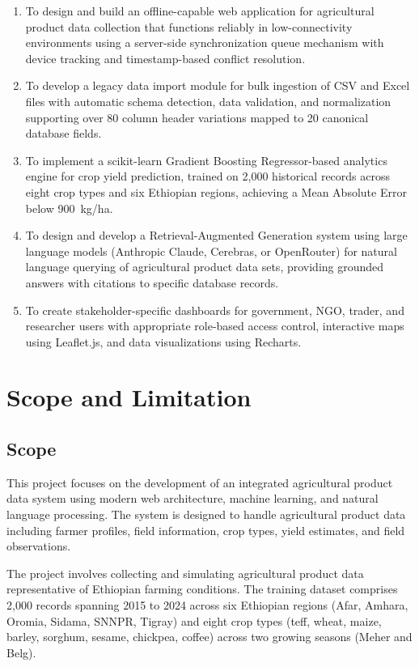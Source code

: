 \begin{enumerate}
  \item To design and build an offline-capable web application for agricultural product data collection that functions reliably in low-connectivity environments using a server-side synchronization queue mechanism with device tracking and timestamp-based conflict resolution.
  \item To develop a legacy data import module for bulk ingestion of CSV and Excel files with automatic schema detection, data validation, and normalization supporting over 80 column header variations mapped to 20 canonical database fields.
  \item To implement a scikit-learn Gradient Boosting Regressor-based analytics engine for crop yield prediction, trained on 2,000 historical records across eight crop types and six Ethiopian regions, achieving a Mean Absolute Error below 900~kg/ha.
  \item To design and develop a Retrieval-Augmented Generation system using large language models (Anthropic Claude, Cerebras, or OpenRouter) for natural language querying of agricultural product data sets, providing grounded answers with citations to specific database records.
  \item To create stakeholder-specific dashboards for government, NGO, trader, and researcher users with appropriate role-based access control, interactive maps using Leaflet.js, and data visualizations using Recharts.
\end{enumerate}

\section{Scope and Limitation}

\subsection{Scope}

This project focuses on the development of an integrated agricultural product data system using modern web architecture, machine learning, and natural language processing. The system is designed to handle agricultural product data including farmer profiles, field information, crop types, yield estimates, and field observations.

The project involves collecting and simulating agricultural product data representative of Ethiopian farming conditions. The training dataset comprises 2,000 records spanning 2015 to 2024 across six Ethiopian regions (Afar, Amhara, Oromia, Sidama, SNNPR, Tigray) and eight crop types (teff, wheat, maize, barley, sorghum, sesame, chickpea, coffee) across two growing seasons (Meher and Belg).

